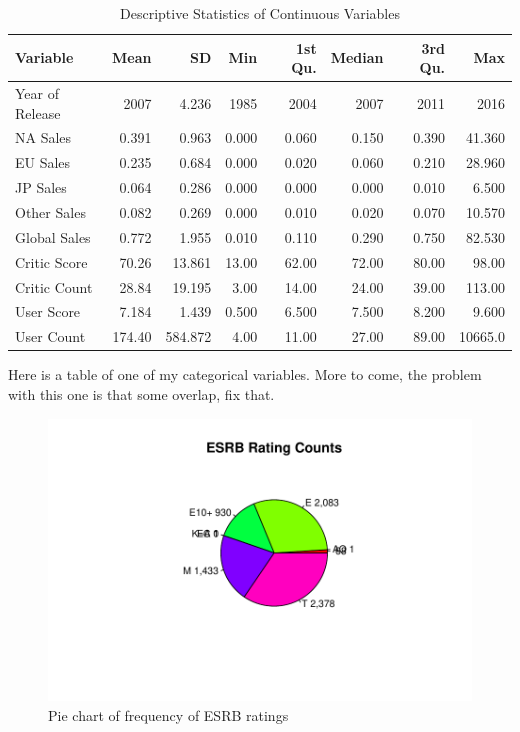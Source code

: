 \documentclass[12pt]{article}
\begin{document}
\begin{table}[ht]
  \caption{Descriptive Statistics of Continuous Variables}
\label{tab:ds}
\centering
\begin{tabular}{lrrrrrrr}
    \hline
  Variable & Mean & SD & Min & 1st Qu. & Median & 3rd Qu. & Max \\ 
    \hline
    Year of Release & 2007 & 4.236 & 1985 & 2004 & 2007 & 2011 & 2016\\ 
    NA Sales & 0.391 & 0.963 & 0.000 & 0.060 & 0.150 & 0.390 & 41.360\\ 
    EU Sales & 0.235 & 0.684 & 0.000 & 0.020 & 0.060 & 0.210 & 28.960\\ 
    JP Sales & 0.064 & 0.286 & 0.000 & 0.000 & 0.000 & 0.010 & 6.500\\ 
    Other Sales & 0.082 & 0.269 & 0.000 & 0.010 & 0.020 & 0.070 & 10.570\\ 
    Global Sales & 0.772 & 1.955 & 0.010 & 0.110 & 0.290 & 0.750 & 82.530\\ 
    Critic Score & 70.26 & 13.861 & 13.00 & 62.00 & 72.00 & 80.00 & 98.00\\
    Critic Count & 28.84 & 19.195 & 3.00 & 14.00 & 24.00 & 39.00 & 113.00\\
    User Score & 7.184 & 1.439 & 0.500 & 6.500 & 7.500 & 8.200 & 9.600\\ 
    User Count & 174.40 & 584.872 & 4.00 & 11.00 & 27.00 & 89.00 & 10665.0\\
     \hline
  \end{tabular}
  \end{table}

Here is a table of one of my categorical variables. More to come, the problem with this one is that some overlap, fix that.
\begin{figure}[tbp]
  \centering
  \includegraphics[width=\textwidth]{ESRBv1.pdf}
  \caption{Pie chart of frequency of ESRB ratings}
  \label{fig:USRB}
\end{figure}
\end{document}
